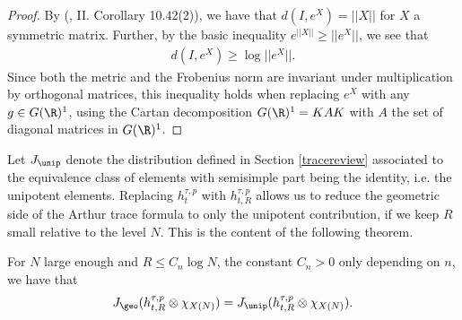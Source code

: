 \begin{proof}
    By (\cite{bridsonhaefliger}, II. Corollary 10.42(2)), we have that $d(I,e^X) = ||X||$ for $X$ a symmetric matrix. Further, by the basic inequality $e^{||X||}\geq ||e^X||$, we see that
\begin{align*}
    d(I,e^X)\geq \log||e^X||.
\end{align*}
Since both the metric and the Frobenius norm are invariant under multiplication by orthogonal matrices, this inequality holds when replacing $e^X$ with any $g\in G(\R)^1$, using the Cartan decomposition $G(\R)^1=KAK$ with $A$ the set of diagonal matrices in $G(\R)^1$.
\end{proof}

\noindent Let $J_{\unip}$ denote the distribution defined in Section \ref{tracereview} associated to the equivalence class of elements with semisimple part being the identity, i.e. the unipotent elements. Replacing $h_t^{\tau,p}$ with $h_{t,R}^{\tau,p}$ allows us to reduce the geometric side of the Arthur trace formula to only the unipotent contribution, if we keep $R$ small relative to the level $N$. This is the content of the following theorem.

\begin{prop}\label{compactunip}
    For $N$ large enough and $R\leq C_n\log N$, the constant $C_n>0$ only depending on $n$, we have that
    \begin{align*}
        J_{\geo}(h_{t,R}^{\tau,p}\otimes\chi_{{X(N)}}) = J_{\unip}(h_{t,R}^{\tau,p}\otimes\chi_{{X(N)}}).
    \end{align*}
\end{prop}

